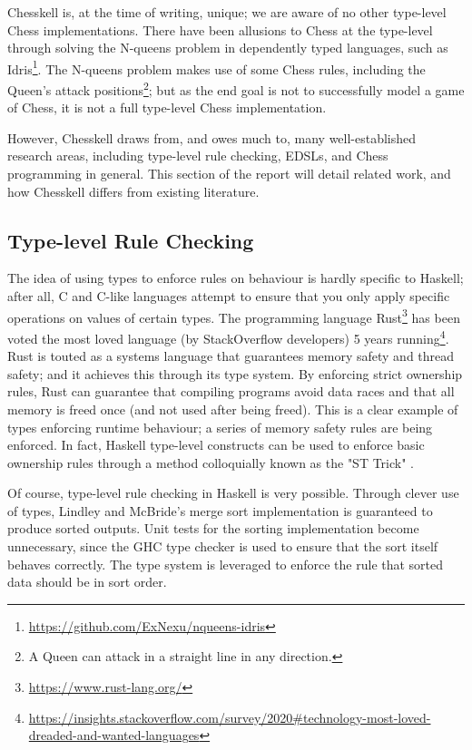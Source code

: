 Chesskell is, at the time of writing, unique; we are aware of no other type-level Chess implementations. There have been allusions to Chess at the type-level through solving the N-queens problem in dependently typed languages, such as Idris\footnote{\url{https://github.com/ExNexu/nqueens-idris}}. The N-queens problem makes use of some Chess rules, including the Queen's attack positions\footnote{A Queen can attack in a straight line in any direction.}; but as the end goal is not to successfully model a game of Chess, it is not a full type-level Chess implementation.

However, Chesskell draws from, and owes much to, many well-established research areas, including type-level rule checking, EDSLs, and Chess programming in general. This section of the report will detail related work, and how Chesskell differs from existing literature.

\subsection{Type-level Rule Checking}

The idea of using types to enforce rules on behaviour is hardly specific to Haskell; after all, C and C-like languages attempt to ensure that you only apply specific operations on values of certain types. The programming language Rust\footnote{\url{https://www.rust-lang.org/}} has been voted the most loved language (by StackOverflow developers) 5 years running\footnote{\url{https://insights.stackoverflow.com/survey/2020\#technology-most-loved-dreaded-and-wanted-languages}}. Rust is touted as a systems language that guarantees memory safety and thread safety; and it achieves this through its type system. By enforcing strict ownership rules, Rust can guarantee that compiling programs avoid data races and that all memory is freed once (and not used after being freed). This is a clear example of types enforcing runtime behaviour; a series of memory safety rules are being enforced. In fact, Haskell type-level constructs can be used to enforce basic ownership rules through a method colloquially known as the "ST Trick" \cite{twt}.

Of course, type-level rule checking in Haskell is very possible. Through clever use of types, Lindley and McBride's merge sort implementation \cite{hasochism} is guaranteed to produce sorted outputs. Unit tests for the sorting implementation become unnecessary, since the GHC type checker is used to ensure that the sort itself behaves correctly. The type system is leveraged to enforce the rule that sorted data should be in sort order.

